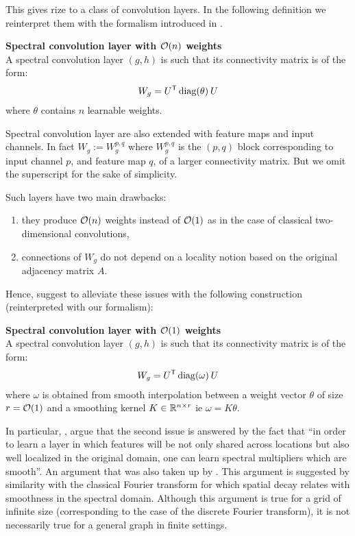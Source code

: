 This gives rize to a class of convolution layers. In the following definition we reinterpret them with the formalism introduced in .

\begin{definition}\textbf{Spectral convolution layer with $\co(n)$ weights}\\
A spectral convolution layer $(g,h)$ is such that its connectivity matrix is of the form:
\begin{gather*}
W_g = U^{\T} \diag(\theta) \h{2} U
\end{gather*}
where $\theta$ contains $n$ learnable weights.
\end{definition}

\begin{remark}Spectral convolution layer are also extended with feature maps and input channels. In fact $W_g := W_g^{p,q}$ where $W_g^{p,q}$ is the $(p,q)$ block corresponding to input channel $p$, and feature map $q$, of a larger connectivity matrix. But we omit the superscript for the sake of simplicity.
\end{remark}

Such layers have two main drawbacks:
\begin{enumerate}
  \item they produce $\co(n)$ weights instead of $\co(1)$ as in the case of classical two-dimensional convolutions,
  \item connections of $W_g$ do not depend on a locality notion based on the original adjacency matrix $A$.
\end{enumerate}

Hence, \cite{bruna2013spectral} suggest to alleviate these issues with the following construction (reinterpreted with our formalism):

\begin{definition}\textbf{Spectral convolution layer with $\co(1)$ weights}\\
A spectral convolution layer $(g,h)$ is such that its connectivity matrix is of the form:
\begin{gather*}
W_g = U^{\T} \diag(\omega) \h{2} U
\end{gather*}
where $\omega$ is obtained from smooth interpolation between a weight vector $\theta$ of size $r = \co(1)$ and a smoothing kernel $K \in \bbr^{n \times r}$ ie $\omega = K \theta$.
\end{definition}

In particular, \cite{bruna2013spectral}, argue that the second issue is answered by the fact that ``in order to learn a layer in which features will be not only shared across locations but also well localized in the original domain, one can learn spectral multipliers which are smooth''. An argument that was also taken up by \cite{henaff2015deep}. This argument is suggested by similarity with the classical Fourier transform for which spatial decay relates with smoothness in the spectral domain. Although this argument is true for a grid of infinite size (corresponding to the case of the discrete Fourier transform), it is not necessarily true for a general graph in finite settings.

